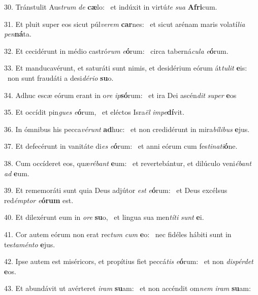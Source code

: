 30. Tránstulit Aus\textit{trum} \textit{de} \textbf{cæ}lo: \ast\  et indúxit in virtú\textit{te} \textit{su}\textit{a} \textbf{A}\textbf{fri}cum.\

31. Et pluit super eos sicut púl\textit{ve}\textit{rem} \textbf{car}nes: \ast\  et sicut arénam maris volatí\textit{li}\textit{a} \textit{pen}\textbf{ná}ta.\

32. Et cecidérunt in médio castró\textit{rum} \textit{e}\textbf{ó}rum: \ast\  circa taberná\textit{cu}\textit{la} \textit{e}\textbf{ó}rum.\

33. Et manducavérunt, et saturáti sunt nimis, et desidérium eórum át\textit{tu}\textit{lit} \textbf{e}is: \ast\  non sunt fraudáti a desi\textit{dé}\textit{ri}\textit{o} \textbf{su}o.\

34. Adhuc escæ eórum erant in o\textit{re} \textit{ip}\textbf{só}rum: \ast\  et ira Dei ascén\textit{dit} \textit{su}\textit{per} \textbf{e}os\

35. Et occídit pin\textit{gues} \textit{e}\textbf{ó}rum, \ast\  et eléctos Isra\textit{ël} \textit{im}\textit{pe}\textbf{dí}vit.\

36. In ómnibus his pecca\textit{vé}\textit{runt} \textbf{ad}huc: \ast\  et non credidérunt in mira\textit{bí}\textit{li}\textit{bus} \textbf{e}jus.\

37. Et defecérunt in vanitáte di\textit{es} \textit{e}\textbf{ó}rum: \ast\  et anni eórum cum fes\textit{ti}\textit{na}\textit{ti}\textbf{ó}ne.\

38. Cum occíderet eos, quæ\textit{ré}\textit{bant} \textbf{e}um: \ast\  et revertebántur, et dilúculo veni\textit{é}\textit{bant} \textit{ad} \textbf{e}um.\

39. Et rememoráti sunt quia Deus adjútor \textit{est} \textit{e}\textbf{ó}rum: \ast\  et Deus excélsus red\textit{émp}\textit{tor} \textit{e}\textbf{ó}\textbf{rum} est.\

40. Et dilexérunt eum in \textit{o}\textit{re} \textbf{su}o, \ast\  et lingua sua men\textit{tí}\textit{ti} \textit{sunt} \textbf{e}i.\

41. Cor autem eórum non erat rec\textit{tum} \textit{cum} \textbf{e}o: \ast\  nec fidéles hábiti sunt in tes\textit{ta}\textit{mén}\textit{to} \textbf{e}jus.\

42. Ipse autem est miséricors, et propítius fiet peccá\textit{tis} \textit{e}\textbf{ó}rum: \ast\  et non \textit{dis}\textit{pér}\textit{det} \textbf{e}os.\

43. Et abundávit ut avérteret \textit{i}\textit{ram} \textbf{su}am: \ast\  et non accéndit om\textit{nem} \textit{i}\textit{ram} \textbf{su}am:\

